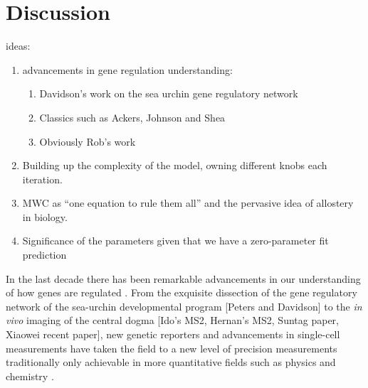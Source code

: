 \section*{Discussion }



ideas:
\begin{enumerate}
  \item advancements in gene regulation understanding:
    \begin{enumerate}
      \item Davidson's work on the sea urchin gene regulatory network
      \item Classics such as Ackers, Johnson and Shea
      \item Obviously Rob's work
    \end{enumerate}
  \item Building up the complexity of the model, owning different knobs each
  iteration.
  \item MWC as ``one equation to rule them all'' and the pervasive idea of
  allostery in biology.
  \item Significance of the parameters given that we have a zero-parameter fit
  prediction
\end{enumerate}

In the last decade there has been remarkable advancements in our understanding
of how genes are regulated . From the exquisite dissection of the gene regulatory
network of the sea-urchin developmental program [Peters and Davidson] to the
\textit{in vivo} imaging of the central dogma [Ido's MS2, Hernan's MS2, Suntag
paper, Xiaowei recent paper], new genetic reporters and  advancements in
single-cell measurements have taken the field to a new level of precision
measurements traditionally only achievable in more quantitative fields such as
physics and chemistry .

